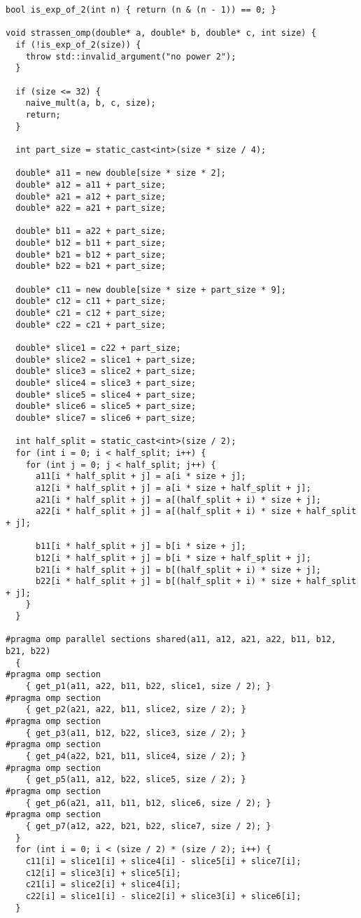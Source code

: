 \documentclass{report}
\begin{document}
\begin{lstlisting}
bool is_exp_of_2(int n) { return (n & (n - 1)) == 0; }

void strassen_omp(double* a, double* b, double* c, int size) {
  if (!is_exp_of_2(size)) {
    throw std::invalid_argument("no power 2");
  }

  if (size <= 32) {
    naive_mult(a, b, c, size);
    return;
  }

  int part_size = static_cast<int>(size * size / 4);

  double* a11 = new double[size * size * 2];
  double* a12 = a11 + part_size;
  double* a21 = a12 + part_size;
  double* a22 = a21 + part_size;

  double* b11 = a22 + part_size;
  double* b12 = b11 + part_size;
  double* b21 = b12 + part_size;
  double* b22 = b21 + part_size;

  double* c11 = new double[size * size + part_size * 9];
  double* c12 = c11 + part_size;
  double* c21 = c12 + part_size;
  double* c22 = c21 + part_size;

  double* slice1 = c22 + part_size;
  double* slice2 = slice1 + part_size;
  double* slice3 = slice2 + part_size;
  double* slice4 = slice3 + part_size;
  double* slice5 = slice4 + part_size;
  double* slice6 = slice5 + part_size;
  double* slice7 = slice6 + part_size;

  int half_split = static_cast<int>(size / 2);
  for (int i = 0; i < half_split; i++) {
    for (int j = 0; j < half_split; j++) {
      a11[i * half_split + j] = a[i * size + j];
      a12[i * half_split + j] = a[i * size + half_split + j];
      a21[i * half_split + j] = a[(half_split + i) * size + j];
      a22[i * half_split + j] = a[(half_split + i) * size + half_split + j];

      b11[i * half_split + j] = b[i * size + j];
      b12[i * half_split + j] = b[i * size + half_split + j];
      b21[i * half_split + j] = b[(half_split + i) * size + j];
      b22[i * half_split + j] = b[(half_split + i) * size + half_split + j];
    }
  }

#pragma omp parallel sections shared(a11, a12, a21, a22, b11, b12, b21, b22)
  {
#pragma omp section
    { get_p1(a11, a22, b11, b22, slice1, size / 2); }
#pragma omp section
    { get_p2(a21, a22, b11, slice2, size / 2); }
#pragma omp section
    { get_p3(a11, b12, b22, slice3, size / 2); }
#pragma omp section
    { get_p4(a22, b21, b11, slice4, size / 2); }
#pragma omp section
    { get_p5(a11, a12, b22, slice5, size / 2); }
#pragma omp section
    { get_p6(a21, a11, b11, b12, slice6, size / 2); }
#pragma omp section
    { get_p7(a12, a22, b21, b22, slice7, size / 2); }
  }
  for (int i = 0; i < (size / 2) * (size / 2); i++) {
    c11[i] = slice1[i] + slice4[i] - slice5[i] + slice7[i];
    c12[i] = slice3[i] + slice5[i];
    c21[i] = slice2[i] + slice4[i];
    c22[i] = slice1[i] - slice2[i] + slice3[i] + slice6[i];
  }


\end{lstlisting}
\end{document}
